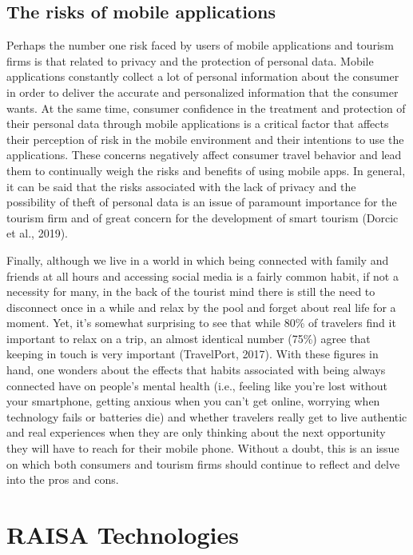 \documentclass[
  letterpaper,
  DIV=11,
  numbers=noendperiod]{scrreprt}
\begin{document}
\hypertarget{the-risks-of-mobile-applications}{%
\subsection{The risks of mobile
applications}\label{the-risks-of-mobile-applications}}

Perhaps the number one risk faced by users of mobile applications and
tourism firms is that related to privacy and the protection of personal
data. Mobile applications constantly collect a lot of personal
information about the consumer in order to deliver the accurate and
personalized information that the consumer wants. At the same time,
consumer confidence in the treatment and protection of their personal
data through mobile applications is a critical factor that affects their
perception of risk in the mobile environment and their intentions to use
the applications. These concerns negatively affect consumer travel
behavior and lead them to continually weigh the risks and benefits of
using mobile apps. In general, it can be said that the risks associated
with the lack of privacy and the possibility of theft of personal data
is an issue of paramount importance for the tourism firm and of great
concern for the development of smart tourism (Dorcic et al., 2019).

Finally, although we live in a world in which being connected with
family and friends at all hours and accessing social media is a fairly
common habit, if not a necessity for many, in the back of the tourist
mind there is still the need to disconnect once in a while and relax by
the pool and forget about real life for a moment. Yet, it's somewhat
surprising to see that while 80\% of travelers find it important to
relax on a trip, an almost identical number (75\%) agree that keeping in
touch is very important (TravelPort, 2017). With these figures in hand,
one wonders about the effects that habits associated with being always
connected have on people's mental health (i.e., feeling like you're lost
without your smartphone, getting anxious when you can't get online,
worrying when technology fails or batteries die) and whether travelers
really get to live authentic and real experiences when they are only
thinking about the next opportunity they will have to reach for their
mobile phone. Without a doubt, this is an issue on which both consumers
and tourism firms should continue to reflect and delve into the pros and
cons.

\hypertarget{raisa-technologies}{%
\section{RAISA Technologies}\label{raisa-technologies}}
\end{document}
